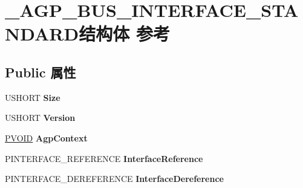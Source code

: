 \hypertarget{struct___a_g_p___b_u_s___i_n_t_e_r_f_a_c_e___s_t_a_n_d_a_r_d}{}\section{\+\_\+\+A\+G\+P\+\_\+\+B\+U\+S\+\_\+\+I\+N\+T\+E\+R\+F\+A\+C\+E\+\_\+\+S\+T\+A\+N\+D\+A\+R\+D结构体 参考}
\label{struct___a_g_p___b_u_s___i_n_t_e_r_f_a_c_e___s_t_a_n_d_a_r_d}
\subsection*{Public 属性}
\begin{DoxyCompactItemize}
\item 
\mbox{\label{struct___a_g_p___b_u_s___i_n_t_e_r_f_a_c_e___s_t_a_n_d_a_r_d_affe19f9b8699153d62970a59f11b5d4f}} 
U\+S\+H\+O\+RT {\bfseries Size}
\item 
\mbox{\label{struct___a_g_p___b_u_s___i_n_t_e_r_f_a_c_e___s_t_a_n_d_a_r_d_a592272f6675d471c34b22ba514d4506e}} 
U\+S\+H\+O\+RT {\bfseries Version}
\item 
\mbox{\label{struct___a_g_p___b_u_s___i_n_t_e_r_f_a_c_e___s_t_a_n_d_a_r_d_a9335ea80fda82a45911afa6db13f0c59}} 
\hyperlink{interfacevoid}{P\+V\+O\+ID} {\bfseries Agp\+Context}
\item 
\mbox{\label{struct___a_g_p___b_u_s___i_n_t_e_r_f_a_c_e___s_t_a_n_d_a_r_d_a5a1019b4c15cd78e215e1b11b3499b74}} 
P\+I\+N\+T\+E\+R\+F\+A\+C\+E\+\_\+\+R\+E\+F\+E\+R\+E\+N\+CE {\bfseries Interface\+Reference}
\item 
\mbox{\label{struct___a_g_p___b_u_s___i_n_t_e_r_f_a_c_e___s_t_a_n_d_a_r_d_aa98b0a171b0a676ab79ca950bce6aaec}} 
P\+I\+N\+T\+E\+R\+F\+A\+C\+E\+\_\+\+D\+E\+R\+E\+F\+E\+R\+E\+N\+CE {\bfseries Interface\+Dereference}
\item 
\mbox{\label{struct___a_g_p___b_u_s___i_n_t_e_r_f_a_c_e___s_t_a_n_d_a_r_d_a64863d595031a57dfc159e9f30d2bb58}} 

\end{DoxyCompactItemize}
